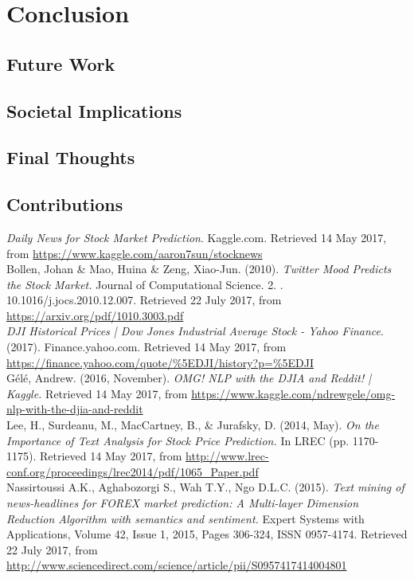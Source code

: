 \documentclass[11pt,a4paper]{article}
\begin{document}
\section{Conclusion}
\subsection{Future Work}
\subsection{Societal Implications}
\subsection{Final Thoughts}

\subsection{Contributions}




\textit{Daily News for Stock Market Prediction}. Kaggle.com. Retrieved 14 May 2017, from \url{https://www.kaggle.com/aaron7sun/stocknews}\\

Bollen, Johan \& Mao, Huina \& Zeng, Xiao-Jun. (2010). \textit{Twitter Mood Predicts the Stock Market.} Journal of Computational Science. 2. . 10.1016/j.jocs.2010.12.007. Retrieved 22 July 2017, from \url{https://arxiv.org/pdf/1010.3003.pdf}\\


\textit{DJI Historical Prices | Dow Jones Industrial Average Stock - Yahoo Finance}. (2017). Finance.yahoo.com. Retrieved 14 May 2017, from \url{https://finance.yahoo.com/quote/\%5EDJI/history?p=\%5EDJI}\\

G\'el\'e, Andrew. (2016, November). \textit{OMG! NLP with the DJIA and Reddit! | Kaggle.} Retrieved 14 May 2017, from \url{https://www.kaggle.com/ndrewgele/omg-nlp-with-the-djia-and-reddit}\\

Lee, H., Surdeanu, M., MacCartney, B., \& Jurafsky, D. (2014, May). \textit{On the Importance of Text Analysis for Stock Price Prediction.} In LREC (pp. 1170-1175). Retrieved 14 May 2017, from \url{http://www.lrec-conf.org/proceedings/lrec2014/pdf/1065_Paper.pdf}\\

Nassirtoussi A.K., Aghabozorgi S., Wah T.Y., Ngo D.L.C. (2015). \textit{Text mining of news-headlines for FOREX market prediction: A Multi-layer Dimension Reduction Algorithm with semantics and sentiment.} Expert Systems with Applications, Volume 42, Issue 1, 2015, Pages 306-324, ISSN 0957-4174. Retrieved 22 July 2017, from \url{http://www.sciencedirect.com/science/article/pii/S0957417414004801}\\
\end{document}
